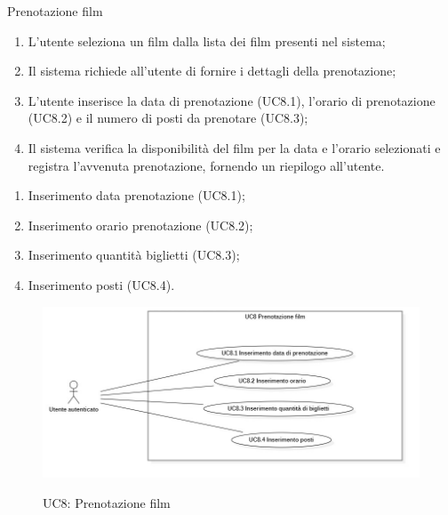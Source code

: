 \begin{usecase}{8}{Prenotazione film}\label{uc:prenotazione-film}
  \usecasemain{}
  
  \begin{enumerate}
    \item L'utente seleziona un film dalla lista dei film presenti nel sistema;
    \item Il sistema richiede all'utente di fornire i dettagli della prenotazione; 
    \item L'utente inserisce la data di prenotazione (UC8.1), l'orario di prenotazione (UC8.2) e il numero di posti da prenotare (UC8.3);
    \item Il sistema verifica la disponibilità del film per la data e l'orario selezionati e registra l'avvenuta prenotazione, fornendo un riepilogo all'utente.
  \end{enumerate}

  \begin{enumerate}
    \item Inserimento data prenotazione (UC8.1);
    \item Inserimento orario prenotazione (UC8.2);
    \item Inserimento quantità biglietti (UC8.3);
    \item Inserimento posti (UC8.4).
  \end{enumerate}
\end{usecase}

\begin{figure}[!ht] 
  \centering 
  \includegraphics[width=0.9\columnwidth, alt={Caso d'uso relativo alla prenotazione di un film dell'utente}]{immagini/usecase/UC8.jpg}
  \caption{UC8: Prenotazione film}\label{fig:uc:prenotazione-film}
\end{figure}


